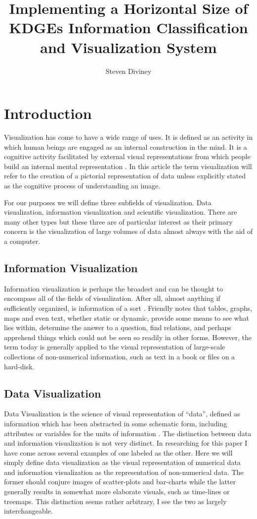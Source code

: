 \documentclass[a4paper, 10pt, titlepage]{article}
\title{Implementing a Horizontal Size of KDGEs Information Classification and Visualization System}
\author{Steven Diviney}
\begin{document}
\maketitle

\newpage

 
\section{Introduction}
Visualization has come to have a wide range of uses. It is defined as an activity in which human beings are engaged as an internal construction in the mind. It is a cognitive activity facilitated by external visual representations from which people build an internal mental representation \cite{spence2001information}. In this article the term visualization will refer to the creation of a pictorial representation of data unless explicitly stated as the cognitive process of understanding an image. 

For our purposes we will define three subfields of visualization. Data visualization, information visualization and scientific visualization. There are many other types but these three are of particular interest as their primary concern is the visualization of large volumes of data almost always with the aid of a computer.
\subsection{Information Visualization}
Information visualization is perhaps the broadest and can be thought to encompass all of the fields of visualization. After all, almost anything if sufficiently organized, is information of a sort \cite{friendly2001milestones}. Friendly notes that tables, graphs, maps and even text, whether static or dynamic, provide some means to see what lies within, determine the answer to a question, find relations, and perhaps apprehend things which could not be seen so readily in other forms. However, the term today is generally applied to the visual representation of large-scale collections of non-numerical information, such as text in a book or files on a hard-disk.
\subsection{Data Visualization}
Data Visualization is the science of visual representation of “data”, defined as information which has been abstracted in some schematic form, including attributes or variables for the units of information \cite{friendly2001milestones}. The distinction between data and information visualization is not very distinct. In researching for this paper I have come across several examples of one labeled as the other. Here we will simply define data visualization as the visual representation of numerical data and information visualization as the representation of non-numerical data. The former should conjure images of scatter-plots and bar-charts while the latter generally results in somewhat more elaborate visuals, such as time-lines or treemaps. This distinction seems rather arbitrary, I see the two as largely interchangeable.
\end{document}
